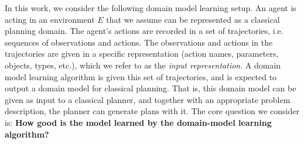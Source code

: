 \documentclass[letterpaper]{article} %
\newcommand{\realm}{{\ensuremath{M^*}}\xspace}
\newif\ifaddcomments
\newcommand{\roni}[1]{\ifaddcomments{\textcolor{red}{[Roni: #1]}}\fi}
\newcommand{\mauro}[1]{\ifaddcomments{\textcolor{green}{[Mauro: #1]}}\fi}
\newcommand{\gregor}[1]{\ifaddcomments{\textcolor{orange}{[Gregor: #1]}}\fi}
\begin{document}
In this work, we consider the following domain model learning setup. 
An agent is acting in an environment $E$ that we assume can be represented as a classical planning domain. 
The agent's actions are recorded in a set of trajectories, i.e. sequences of observations and actions. 
The observations and actions in the trajectories are given in a specific representation (action names, parameters, objects, types, etc.), which we refer to as the \emph{input representation}. 
A domain model learning algorithm is given this set of trajectories, and is expected to output a domain model for classical planning. 
That is, this domain model can be given as input to a classical planner, and together with an appropriate problem description, the planner can generate plans with it.
The core question we consider is: \textbf{How good is the model learned by the domain-model learning algorithm?}
\end{document}
